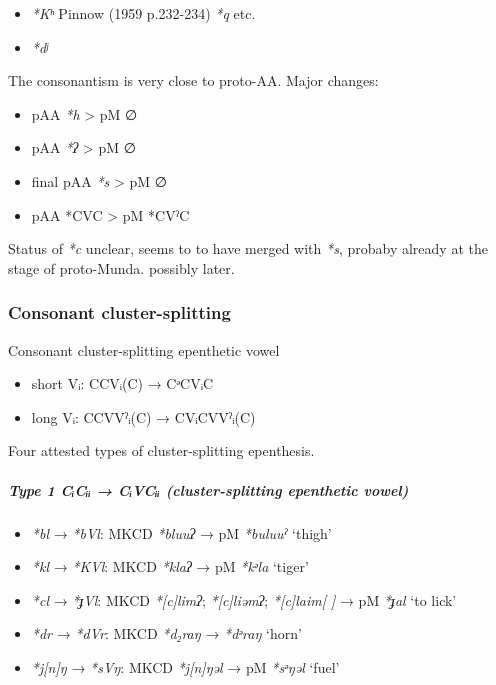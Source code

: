 \documentclass[a4paper,]{article}
\providecommand{\tightlist}{%
  \setlength{\itemsep}{0pt}\setlength{\parskip}{0pt}}
\let\oldsubparagraph\subparagraph
\renewcommand{\subparagraph}[1]{\oldsubparagraph{#1}\mbox{}}
\begin{document}
\begin{itemize}
\tightlist
\item
  \emph{*Kʰ} Pinnow (1959 p.232-234) \emph{*q} etc.
\item
  \emph{*dʲ}
\end{itemize}

The consonantism is very close to proto-AA. Major changes:

\begin{itemize}
\tightlist
\item
  pAA \emph{*h} \textgreater{} pM ∅
\item
  pAA \emph{*ʔ} \textgreater{} pM ∅
\item
  final pAA \emph{*s} \textgreater{} pM ∅
\item
  pAA *CVC \textgreater{} pM *CVˀC
\end{itemize}

Status of \emph{*c} unclear, seems to to have merged with \emph{*s},
probaby already at the stage of proto-Munda. possibly later.

\subsubsection{Consonant
cluster-splitting}\label{consonant-cluster-splitting}

Consonant cluster-splitting epenthetic vowel

\begin{itemize}
\tightlist
\item
  short Vᵢ: CCVᵢ(C) → CᵊCVᵢC
\item
  long Vᵢ: CCVVˀᵢ(C) → CVᵢCVVˀᵢ(C)
\end{itemize}

Four attested types of cluster-splitting epenthesis.

\subparagraph{Type 1 CᵢCᵢᵢ → CᵢVCᵢᵢ (cluster-splitting epenthetic
vowel)}\label{type-1-cux1d62cux1d62ux1d62-cux1d62vcux1d62ux1d62-cluster-splitting-epenthetic-vowel}

\begin{itemize}
\tightlist
\item
  \emph{*bl} → \emph{*bVl}: MKCD \emph{*bluuʔ} → pM \emph{*buluuˀ}
  `thigh'
\item
  \emph{*kl} → \emph{*KVl}: MKCD \emph{*klaʔ} → pM \emph{*kᵊla} `tiger'
\item
  \emph{*cl} → \emph{*ɟVl}: MKCD \emph{*{[}c{]}limʔ};
  \emph{*{[}c{]}liəmʔ}; \emph{*{[}c{]}laim{[} {]}} → pM \emph{*ɟal} `to
  lick'
\item
  \emph{*dr} → \emph{*dVr}: MKCD \emph{*d₂raŋ} → \emph{*dᵊraŋ} `horn'
\item
  \emph{*j{[}n{]}ŋ} → \emph{*sVŋ}: MKCD \emph{*j{[}n{]}ŋəl} → pM
  \emph{*sᵊŋəl} `fuel'
\end{itemize}
\end{document}
